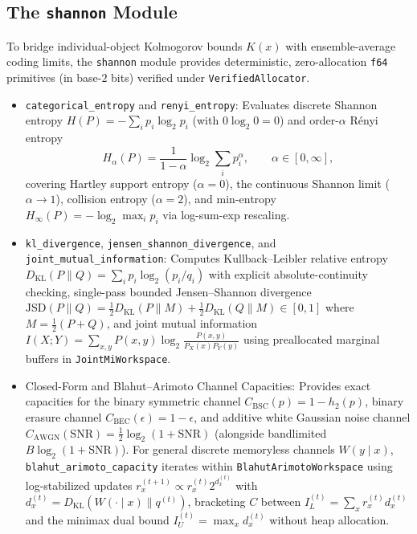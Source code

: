 \documentclass{article}
\begin{document}
\subsection{The \texttt{shannon} Module}

To bridge individual-object Kolmogorov bounds $K(x)$ with ensemble-average coding limits, the \texttt{shannon} module provides deterministic, zero-allocation \texttt{f64} primitives (in base-$2$ bits) verified under \texttt{VerifiedAllocator}.

\begin{itemize}
    \item \texttt{categorical\_entropy} and \texttt{renyi\_entropy}: Evaluates discrete Shannon entropy $H(P) = -\sum_{i} p_i \log_2 p_i$ (with $0 \log_2 0 = 0$) and order-$\alpha$ R\'enyi entropy
    \begin{equation}
        H_{\alpha}(P) = \frac{1}{1 - \alpha} \log_2 \sum_{i} p_i^{\alpha}, \qquad \alpha \in [0, \infty],
    \end{equation}
    covering Hartley support entropy ($\alpha = 0$), the continuous Shannon limit ($\alpha \to 1$), collision entropy ($\alpha = 2$), and min-entropy $H_{\infty}(P) = -\log_2 \max_i p_i$ via log-sum-exp rescaling.
    \item \texttt{kl\_divergence}, \texttt{jensen\_shannon\_divergence}, and \texttt{joint\_mutual\_information}: Computes Kullback--Leibler relative entropy $D_{\mathrm{KL}}(P \parallel Q) = \sum_i p_i \log_2(p_i / q_i)$ with explicit absolute-continuity checking, single-pass bounded Jensen--Shannon divergence $\mathrm{JSD}(P \parallel Q) = \frac{1}{2} D_{\mathrm{KL}}(P \parallel M) + \frac{1}{2} D_{\mathrm{KL}}(Q \parallel M) \in [0, 1]$ where $M = \frac{1}{2}(P + Q)$, and joint mutual information $I(X; Y) = \sum_{x, y} P(x, y) \log_2 \frac{P(x, y)}{P_X(x) P_Y(y)}$ using preallocated marginal buffers in \texttt{JointMiWorkspace}.
    \item Closed-Form and Blahut--Arimoto Channel Capacities: Provides exact capacities for the binary symmetric channel $C_{\mathrm{BSC}}(p) = 1 - h_2(p)$, binary erasure channel $C_{\mathrm{BEC}}(\epsilon) = 1 - \epsilon$, and additive white Gaussian noise channel $C_{\mathrm{AWGN}}(\mathrm{SNR}) = \frac{1}{2}\log_2(1 + \mathrm{SNR})$ (alongside bandlimited $B \log_2(1 + \mathrm{SNR})$). For general discrete memoryless channels $W(y \mid x)$, \texttt{blahut\_arimoto\_capacity} iterates within \texttt{BlahutArimotoWorkspace} using log-stabilized updates $r_x^{(t+1)} \propto r_x^{(t)} 2^{d_x^{(t)}}$ with $d_x^{(t)} = D_{\mathrm{KL}}(W(\cdot \mid x) \parallel q^{(t)})$, bracketing $C$ between $I_L^{(t)} = \sum_x r_x^{(t)} d_x^{(t)}$ and the minimax dual bound $I_U^{(t)} = \max_x d_x^{(t)}$ without heap allocation.
\end{itemize}
\end{document}
